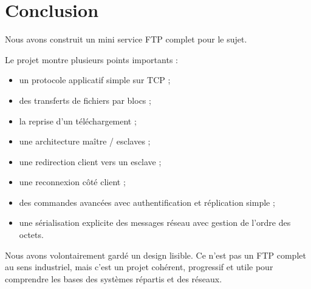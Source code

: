 \documentclass[a4paper,11pt]{article}
\begin{document}
\newpage
\section{Conclusion}

Nous avons construit un mini service FTP complet pour le sujet.

Le projet montre plusieurs points importants :

\begin{itemize}[leftmargin=*]
    \item un protocole applicatif simple sur TCP ;
    \item des transferts de fichiers par blocs ;
    \item la reprise d'un téléchargement ;
    \item une architecture maître / esclaves ;
    \item une redirection client vers un esclave ;
    \item une reconnexion côté client ;
    \item des commandes avancées avec authentification et réplication simple ;
    \item une sérialisation explicite des messages réseau avec gestion de l'ordre des octets.
\end{itemize}

Nous avons volontairement gardé un design lisible. Ce n'est pas un FTP complet
au sens industriel, mais c'est un projet cohérent, progressif et utile pour
comprendre les bases des systèmes répartis et des réseaux.
\end{document}
